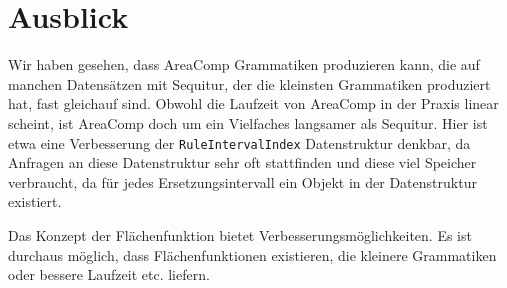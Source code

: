 \chapter{Ausblick}
\label{ausblick}

Wir haben gesehen, dass AreaComp Grammatiken produzieren kann, die auf manchen Datensätzen mit Sequitur, der die kleinsten Grammatiken produziert hat, fast gleichauf sind. Obwohl die Laufzeit von AreaComp in der Praxis linear scheint, ist AreaComp doch um ein Vielfaches langsamer als Sequitur. 
Hier ist etwa eine Verbesserung der \texttt{RuleIntervalIndex} Datenstruktur denkbar, da Anfragen an diese Datenstruktur sehr oft stattfinden und diese viel Speicher verbraucht, da für jedes Ersetzungsintervall ein Objekt in der Datenstruktur existiert.

Das Konzept der Flächenfunktion bietet Verbesserungsmöglichkeiten. Es ist durchaus möglich, dass Flächenfunktionen existieren, die kleinere Grammatiken oder bessere Laufzeit etc. liefern. 

